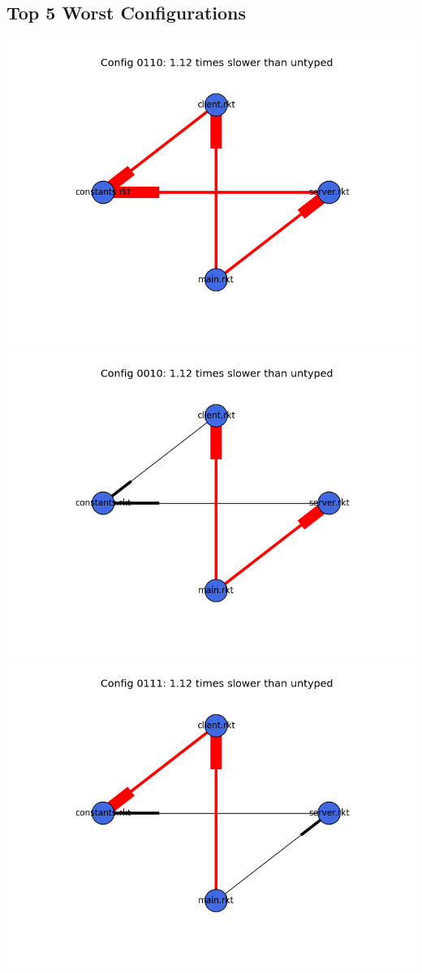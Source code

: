 \documentclass{article}
\begin{document}
\begin{itemize}
\subsection{Top 5 Worst Configurations}
\includegraphics[width=\textwidth]{echo-module-graph-0110.png}
\includegraphics[width=\textwidth]{echo-module-graph-0010.png}
\includegraphics[width=\textwidth]{echo-module-graph-0111.png}

\end{itemize}
\end{document}
